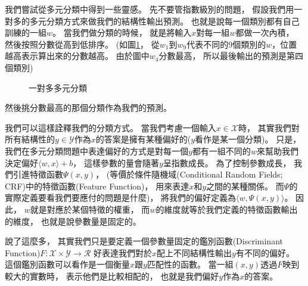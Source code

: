  我們嘗試從多元分類中得到一些靈感。
  先不要管指數級別的問題，
  假設我們用一對多的多元分類方式來做我們的結構性輸出預測。
  也就是說每一個類別都有自己訓練的一組$w$。
  當我們做分類的時候，
  就是將輸入$x$對每一組$w$都做一次內積，
  然後按照分數從高到低排序。
  (如圖\ref{fig:multiple_svm_rank}，
  從$w_1$到$w_9$代表不同的9個類別的$w$，位置越高表示算出來的分數越高。
  由於圖中$w_4$分數最高，
  所以最後輸出的預測是第四個類別)
  \begin{figure}
    \begin{center}
      \caption{一對多多元分類}
      \label{fig:multiple_svm_rank}
    \end{center}
  \end{figure}
  然後挑分數最高的那個分類作為我們的預測。

  我們可以這樣詮釋我們的分類方式。
  當我們考慮一個輸入$x \in \mathcal{X}$時，
  其實我們對所有結構性的$y \in \mathcal{Y}$作為$x$的答案是擁有某種偏好的($y$看作是某一個分類)。
  只是，
  我們在多元分類問題中表達偏好的方式是對每一個$y$都有一組不同的$w$來幫助我們決定偏好$\langle w, x \rangle + b$，
  這樣參數的量會隨著$y$呈指數成長。
  為了控制參數成長，
  我們引進特徵函數$\Psi(x, y)$，
  (等價於條件隨機域(Conditional Random Fields; CRF)中的特徵函數(Feature Function)，
  用來表達$x$和$y$之間的某種關係。
  而$\Psi$的實際定義要看我們要應付的問題是什麼)，
  將我們的偏好定義為$\langle w, \Psi(x, y) \rangle$。
  因此，
  $w$就是對應於某個特徵的權重，
  而$w$的維度就等於我們定義的特徵函數輸出的維度，
  也就是說參數量是固定的。

  說了這麼多，
  其實我們只是要定義一個參數量固定的鑑別函數(Discriminant Function)$F: \mathcal{X} \times \mathcal{Y} \longrightarrow \mathcal{R}$
  好表達我們對於$x$配上不同結構性輸出$y$有不同的偏好。
  這個鑑別函數可以看作是一個衡量$x$跟$y$匹配性的函數。
  當一組$(x, y)$透過$F$映到較大的實數時，
  表示他們是比較相配的，
  也就是我們偏好$y$作為$x$的答案。

